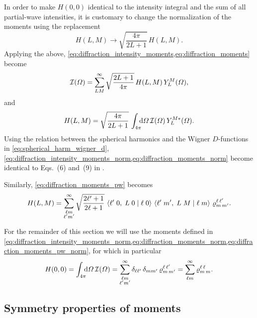 In order to make $H(0, 0)$ identical to the intensity integral and the
sum of all partial-wave intensities, it is customary to change the
normalization of the moments using the replacement
\begin{equation}
  H(L, M)
  \to \sqrt{\frac{4 \pi}{2 L + 1}}\, H(L, M).
\end{equation}
Applying the above,
\cref{eq:diffraction_intensity_moments,eq:diffraction_moments} become
\begin{equation}
  \label{eq:diffraction_intensity_moments_norm}
  \mathcal{I}(\Omega)
  = \sum_{L M}^\infty \sqrt{\frac{2 L + 1}{4 \pi}}\, H(L, M)\, Y_L^M(\Omega),
\end{equation}
and
\begin{equation}
  \label{eq:diffraction_moments_norm}
  H(L, M)
  = \sqrt{\frac{4 \pi}{2 L + 1}}\, \int_{4 \pi}\!\!\! \dif{\Omega}\, \intensity(\Omega)\, Y_L^{M *}(\Omega).
\end{equation}
Using the relation between the spherical harmonics and the Wigner
$D$-functions in \cref{eq:spherical_harm_wigner_d},
\cref{eq:diffraction_intensity_moments_norm,eq:diffraction_moments_norm}
become identical to Eqs.~(6) and~(9) in .

Similarly, \cref{eq:diffraction_moments_pw} becomes
\begin{equation}
  \label{eq:diffraction_moments_pw_norm}
  H(L, M)
  = \sum_{\substack{\ell m \\ \ell' m'}}^\infty
  \sqrt{\frac{2 \ell' + 1}{2 \ell + 1}}\,
  \braket{{\ell'}\;{0},\;{L}\;{0}\; |\; {\ell}\;{0}}\, \braket{{\ell'}\;{m'},\;{L}\;{M}\; |\; {\ell}\;{m}}\,
  \varrho^{\ell\, \ell'}_{m\, m'}.
\end{equation}

For the remainder of this section we will use the moments defined in
\cref{eq:diffraction_intensity_moments_norm,eq:diffraction_moments_norm,eq:diffraction_moments_pw_norm}, for which in particular
\begin{equation}
  \label{eq:diffraction_moment_00_pw}
  H(0, 0)
  = \int_{4 \pi}\!\!\! \dif{\Omega}\, \intensity(\Omega)
  = \sum_{\substack{\ell m \\ \ell' m'}}^\infty \delta_{\ell \ell'}\, \delta_{m m'}\, \varrho^{\ell\, \ell'}_{m\, m'}
  = \sum_{\ell m}^\infty \varrho^{\ell\, \ell}_{m\, m}.
\end{equation}


\subsection{Symmetry properties of moments}%
\label{sec:diffraction:moments_sym}

